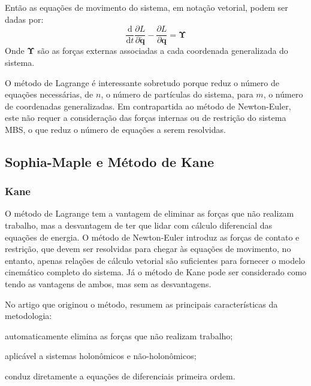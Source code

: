 Então as equações de movimento do sistema, em notação vetorial, podem ser dadas
por:
%
\begin{equation}
	\frac{\mathrm{d} }{\mathrm{d} t}\frac{\partial L}{\partial \mathbf{\dot{q}}} -
	\frac{\partial L}{\partial \mathbf{q}} = \boldsymbol{\Upsilon}
\end{equation}
%
Onde $\boldsymbol{\Upsilon}$ são as forças externas associadas a cada
coordenada generalizada do sistema.

O método de Lagrange é interessante sobretudo porque reduz o número de equações
necessárias, de $n$, o número de partículas do sistema, para $m$, o número de
coordenadas generalizadas. Em contrapartida ao método de Newton-Euler, este
não requer a consideração das forças internas ou de restrição do sistema MBS, o
que reduz o número de equações a serem resolvidas.




\subsection{Sophia-Maple e Método de Kane}\label{sec::sophia_kane}

\subsubsection{Kane}

O método de Lagrange tem a vantagem de eliminar as forças que não realizam
trabalho, mas a desvantagem de ter que lidar com cálculo diferencial das
equações de energia. O método de Newton-Euler introduz as forças de contato e
restrição, que devem ser resolvidas para chegar às equações de movimento, no
entanto, apenas relações de cálculo vetorial são suficientes para fornecer o
modelo cinemático completo do sistema. Já o método de Kane pode ser
considerado como tendo as vantagens de ambos, mas sem as desvantagens.

No artigo que originou o método, \citet{kane1965derivation} resumem
as principais características da metodologia: 
%
\begin{enumerate*}[label=\emph{\alph*})]
	\item automaticamente elimina as forças que não realizam trabalho;
	\item aplicável a sistemas holonômicos e não-holonômicos;
	\item conduz diretamente a equações de diferenciais primeira ordem.
\end{enumerate*}

